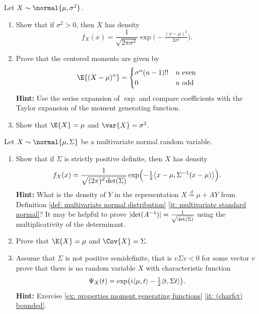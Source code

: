 
\begin{exercise}[subtitle={The normal distribution \Coffeecup\Coffeecup\Coffeecup}]
    \label{ex: density of normal distribution}
    Let \(X \sim \normal{\mu, \sigma^2}\).
    \begin{enumerate}[label=(\alph*)]
        \item \label{it: (normal distribution) density}
        Show that if \(\sigma^2 > 0\), then \(X\) has density
        \[
            f_X(x) = \frac1{\sqrt{2\pi \sigma^2}}
            \exp\bigl(-\tfrac{(x-\mu)^2}{2\sigma^2}\bigr).
        \]

        \item\label{it: (normal distribution) moments}
        Prove that the centered moments are given by
        \[
            \E{(X-\mu)^n}
            = \begin{cases}
                \sigma^n (n-1)!! & n \text{ even}
                \\
                0 & n \text{ odd}
            \end{cases}
        \]
        \textbf{Hint:} Use the series expansion of \(\exp\) and compare coefficients
        with the Taylor expansion of the moment generating function.

        \item\label{it: (normal distribution) mean and variance}
        Show that \(\E{X} = \mu\) and \(\var{X} = \sigma^2\).
    \end{enumerate}
    Let \(X \sim \normal{\mu, \Sigma}\) be a multivariate normal random variable.
    \begin{enumerate}[label=(\alph*), resume]
        \item\label{it: (multivariate normal distribution) density}
        Show that if \(\Sigma\) is strictly positive definite, then \(X\) has density
        \[
            f_X(x)
            = \frac1{\sqrt{(2\pi)^\dims \det(\Sigma)}}
            \exp\Bigl(-\tfrac12 \scp[\big]{x - \mu, \Sigma^{-1}(x - \mu)}\Bigr).
        \]
        \textbf{Hint:} What is the density of \(Y\) in the representation \(X
        \overset{d}= \mu + A Y\) from Definition \ref{def: multivariate normal
        distribution} \ref{it: multivariate standard normal}? It may
        be helpful to prove \(\abs{\det(A^{-1})} = \smash{\frac1{\sqrt{\det(\Sigma)}}}\)
        using the multiplicativity of the determinant.
        
        \item\label{it: (multivariate normal distribution) mean and covariance}
        Prove that \(\E{X} = \mu\) and \(\Cov{X} = \Sigma\).

        \item\label{it: (multivariate normal distribution) non-positive semidefinite}
        Assume that \(\Sigma\) is not positive semidefinite, that is
        \(v \Sigma v < 0\) for some vector \(v\) prove that there is no random
        variable \(X\) with characteristic function
        \[
            \charFct_X(t)
            = \exp\bigl(i \scp{\mu, t} - \tfrac12 \scp{t, \Sigma t}\bigr).
        \]
        \textbf{Hint:} Exercise \ref{ex: properties moment generating functions} \ref{it: (charfct) bounded}.
    \end{enumerate}
\end{exercise}
